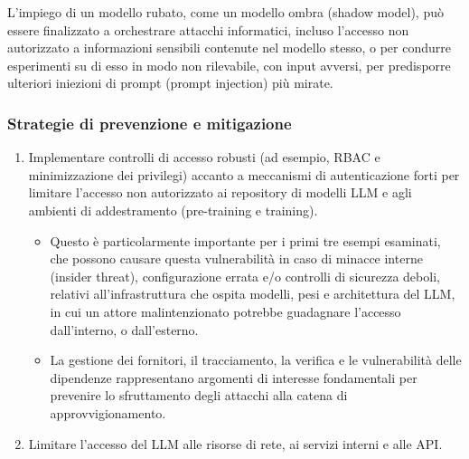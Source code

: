 \documentclass[
]{article}
\providecommand{\tightlist}{%
  \setlength{\itemsep}{0pt}\setlength{\parskip}{0pt}}
\begin{document}
L'impiego di un modello rubato, come un modello ombra (shadow model),
può essere finalizzato a orchestrare attacchi informatici, incluso
l'accesso non autorizzato a informazioni sensibili contenute nel modello
stesso, o per condurre esperimenti su di esso in modo non rilevabile,
con input avversi, per predisporre ulteriori iniezioni di prompt (prompt
injection) più mirate.

\subsubsection{Strategie di prevenzione e
mitigazione}\label{strategie-di-prevenzione-e-mitigazione}

\begin{enumerate}
\def\labelenumi{\arabic{enumi}.}
\tightlist
\item
  Implementare controlli di accesso robusti (ad esempio, RBAC e
  minimizzazione dei privilegi) accanto a meccanismi di autenticazione
  forti per limitare l'accesso non autorizzato ai repository di modelli
  LLM e agli ambienti di addestramento (pre-training e training).

  \begin{itemize}
  \tightlist
  \item
    Questo è particolarmente importante per i primi tre esempi
    esaminati, che possono causare questa vulnerabilità in caso di
    minacce interne (insider threat), configurazione errata e/o
    controlli di sicurezza deboli, relativi all'infrastruttura che
    ospita modelli, pesi e architettura del LLM, in cui un attore
    malintenzionato potrebbe guadagnare l'accesso dall'interno, o
    dall'esterno.
  \item
    La gestione dei fornitori, il tracciamento, la verifica e le
    vulnerabilità delle dipendenze rappresentano argomenti di interesse
    fondamentali per prevenire lo sfruttamento degli attacchi alla
    catena di approvvigionamento.
  \end{itemize}
\item
  Limitare l'accesso del LLM alle risorse di rete, ai servizi interni e
  alle API.


\end{enumerate}
\end{document}
